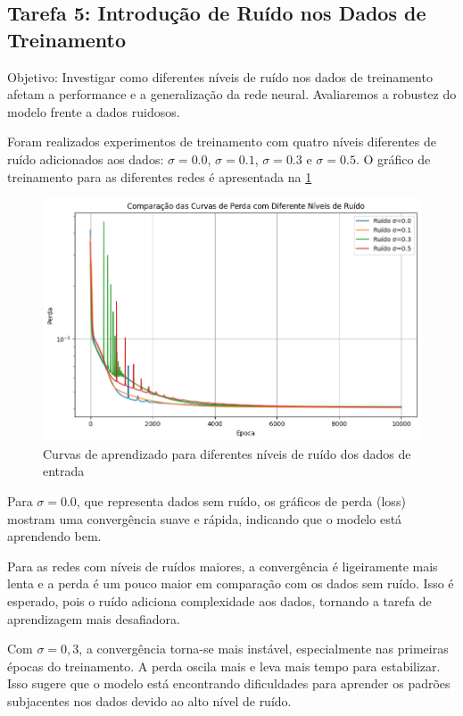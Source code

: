 \subsection{Tarefa 5: Introdução de Ruído nos Dados de Treinamento}

\begin{comandoquestao}
Objetivo: Investigar como diferentes níveis de ruído nos dados de treinamento 
afetam a performance e a generalização da rede neural. Avaliaremos a robustez 
do modelo frente a dados ruidosos.
\end{comandoquestao}

Foram realizados experimentos de treinamento com quatro níveis diferentes de 
ruído adicionados aos dados: $\sigma=0.0$, $\sigma=0.1$, $\sigma=0.3$ e 
$\sigma=0.5$. O gráfico de treinamento para as diferentes redes é apresentada 
na \cref{fig:tarefas05:curvas}


\begin{figure}[tbh]
	\centering
	\caption{Curvas de aprendizado para diferentes níveis de ruído dos dados de 
	entrada}
	\label{fig:tarefas05:curvas}
	\includegraphics[width=0.7\linewidth]{./0803_imgs/0365_tarefa05/png-241110-193148800-7110775020035268662.png}
\end{figure}


Para $\sigma=0.0$, que 
representa dados sem ruído, os gráficos de perda (loss)
mostram uma convergência suave e rápida, indicando que o modelo está aprendendo 
bem.

Para as redes com níveis de ruídos maiores, a convergência é ligeiramente mais 
lenta e a perda é um pouco maior em comparação com os dados sem ruído. Isso é 
esperado, pois o ruído adiciona complexidade aos dados, tornando a tarefa de 
aprendizagem mais desafiadora.

Com $\sigma=0,3$, a convergência torna-se mais instável, especialmente nas 
primeiras 
épocas do treinamento. A perda oscila mais e leva mais tempo para estabilizar. 
Isso sugere que o modelo está encontrando dificuldades para aprender os padrões 
subjacentes nos 
dados devido ao alto nível de ruído.

